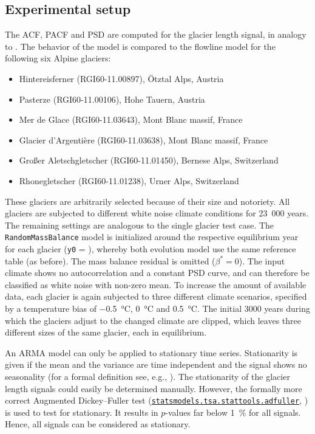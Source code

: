 
    \subsection{Experimental setup} %
    \label{sub:exeperimental_setup}

        The ACF, PACF and PSD are computed for the glacier length signal, in analogy to \citep{Roe2014}. The behavior of the \vas{} model is compared to the flowline model for the following six Alpine glaciers:
        \begin{itemize}
            \item Hintereisferner (RGI60-11.00897), Ötztal Alps, Austria
            \item Pasterze (RGI60-11.00106), Hohe Tauern, Austria
            \item Mer de Glace (RGI60-11.03643), Mont Blanc massif, France
            \item Glacier d'Argentière (RGI60-11.03638), Mont Blanc massif, France
            \item Großer Aletschgletscher (RGI60-11.01450), Bernese Alps, Switzerland
            \item Rhonegletscher (RGI60-11.01238), Urner Alps, Switzerland
        \end{itemize}
        These glaciers are arbitrarily selected because of their size and notoriety. All glaciers are subjected to different white noise climate conditions for 23\ 000 years. The remaining settings are analogous to the single glacier test case. The \lstinline`RandomMassBalance` model is initialized around the respective equilibrium year for each glacier (\lstinline`y0` = \tstar), whereby both evolution model use the same \tstar{} reference table (as before). The mass balance residual is omitted ($\beta^* = 0$). The input climate shows no autocorrelation and a constant PSD curve, and can therefore be classified as white noise with non-zero mean.
        To increase the amount of available data, each glacier is again subjected to three different climate scenarios, specified by a temperature bias of \SI{-0.5}{\celsius}, \SI{0}{\celsius} and \SI{+0.5}{\celsius}. The initial 3000 years during which the glaciers adjust to the changed climate are clipped, which leaves three different sizes of the same glacier, each in equilibrium.

        An ARMA model can only be applied to stationary time series. Stationarity is given if the mean and the variance are time independent and the signal shows no seasonality (for a formal definition see, e.g., \citet{BoxJenkins2015}). The stationarity of the glacier length signals could easily be determined manually. However, the formally more correct Augmented Dickey--Fuller test (\href{https://www.statsmodels.org/devel/generated/statsmodels.tsa.stattools.adfuller.html}{\lstinline`statsmodels.tsa.stattools.adfuller`}, \citet{Cheung1995-ADFuller}) is used to test for stationary. It results in $p$-values far below \SI{1}{\percent} for all signals. Hence, all signals can be considered as stationary.

